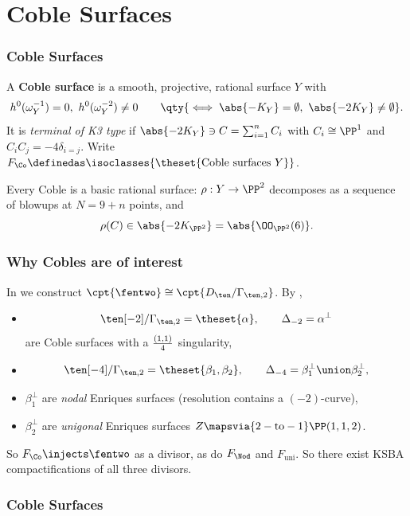\documentclass{beamer}
\begin{document}
{\section{Coble Surfaces}

\begin{frame}\frametitle{Coble Surfaces}
\begin{definition}
A \textbf{Coble surface} \cite{Cob19, Oda85, DZ99, DM20} is a smooth, projective, rational surface $Y$ with 
\[
h^0(\omega_Y^{-1}) = 0, \,\, h^0(\omega_Y^{-2})\neq 0\qquad \qty{\iff \abs{-K_Y} = \emptyset,\,\, \abs{-2K_Y}\neq \emptyset }
.\] 
It is \textit{terminal of K3 type} if $\abs{-2K_Y} \ni C = \sum_{i=1}^n C_i$ with $C_i\cong \PP^1$ and $C_iC_j = -4\delta_{i=j}$. Write $F_{\Co} \definedas \isoclasses{\theset{\text{Coble surfaces } Y}}$.
\end{definition}
\begin{fact}
Every Coble is a basic rational surface: $\rho: Y\to \PP^2$ decomposes as a sequence of blowups at $N = 9+n$ points, and 
\[
\rho(C) \in \abs{-2K_{\PP^2}} = \abs{ \OO_{\PP^2}(6)}
.\]
\end{fact}
\end{frame}
\begin{frame}\frametitle{Why Cobles are of interest}
In \cite{AEGS23} we construct $\cpt{ \fentwo} \cong \cpt{D_{\ten}/\Gamma_{\ten, 2}}$. By \cite{Nam85},
\begin{itemize}
\item \[ \ten[-2]/\Gamma_{\ten, 2} = \theset{\alpha}, \qquad \Delta_{-2} = \alpha^\perp \] are Coble surfaces with a ${(1,1)\over 4}$ singularity,
\item \[ \ten[-4]/\Gamma_{\ten, 2} = \theset{\beta_1, \beta_2}, \qquad \Delta_{-4} = \beta_1^\perp \union \beta_2^\perp, \]
\item $\beta_1^\perp$ are \textit{nodal} Enriques surfaces (resolution contains a $(-2)$-curve),
\item $\beta_2^{\perp}$ are \textit{unigonal} Enriques surfaces $Z \mapsvia{2-\text{to}-1} \PP(1,1,2)$.
\end{itemize}
{\small 
So $F_{\Co} \injects \fentwo$ as a divisor, as do $F_{\Nod}$ and $F_{\mathrm{uni}}$. So there exist KSBA compactifications of all three divisors.
}
\end{frame}
\begin{frame}\frametitle{Coble Surfaces}

\end{frame}}
\end{document}
